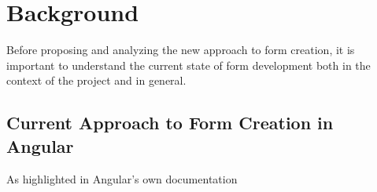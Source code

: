 \section{Background}

Before proposing and analyzing the new approach to form creation, it is important to understand the current state of
form development both in the context of the project and in general.

\subsection{Current Approach to Form Creation in Angular}

As highlighted in Angular's own documentation\cite{Angular:forms}